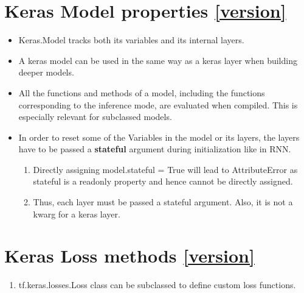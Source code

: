 \documentclass[11pt]{article}
\begin{document}
\begin{multicols*}{2}
\section{Keras Model properties  \autoref{version}}
\begin{itemize}
\item Keras.Model tracks both its variables and its internal layers.
\item A keras model can be used in the same way as a keras layer when building deeper models.
\item All the functions and methods of a model, including the functions corresponding to the inference mode, are evaluated when compiled. This is especially relevant for subclassed models.
\item In order to reset some of the Variables in the model or its layers, the layers have to be passed a \textbf{stateful} argument during initialization like in RNN.
	\begin{enumerate}
	\item Directly assigning model.stateful = True will lead to AttributeError as stateful is a readonly property and hence cannot be directly assigned.
	\item Thus, each layer must be passed a stateful argument. Also, it is not a kwarg for a keras layer.
	\end{enumerate}
	
\end{itemize}



\section{Keras Loss methods  \autoref{version}}
\begin{enumerate}
\item tf.keras.losses.Loss class can be subclassed to define custom loss functions.
\end{enumerate}


\end{multicols*}
\end{document}
